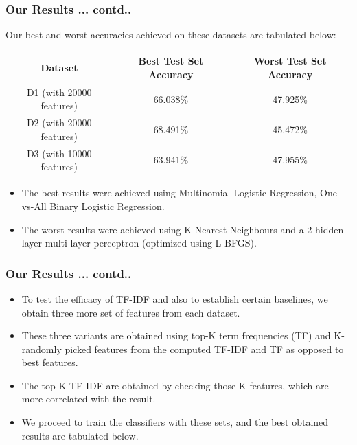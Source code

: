 \documentclass[9pt, compress]{beamer}
\begin{document}
\begin{frame}[fragile]
	\frametitle{Our Results ... contd..}
Our best and worst accuracies achieved on these datasets are tabulated below:
\begin{center}
\begin{tabular}{|c|c|c|}
\hline
Dataset & Best Test Set Accuracy & Worst Test Set Accuracy \\
\hline
\hline
D1 (with 20000 features) & 66.038\% & 47.925\% \\
\hline
D2 (with 20000 features) & 68.491\% & 45.472\% \\
\hline
D3 (with 10000 features) & 63.941\% & 47.955\% \\
\hline
\end{tabular}
\end{center}
\begin{itemize}
\item The best results were achieved using Multinomial Logistic Regression, One-vs-All Binary Logistic Regression.
\item The worst results were achieved using K-Nearest Neighbours and a 2-hidden layer multi-layer perceptron (optimized using L-BFGS).
\end{itemize}
\end{frame}

\begin{frame}[fragile]
	\frametitle{Our Results ... contd..}
\vspace{-10mm}
\begin{itemize}
\item To test the efficacy of TF-IDF and also to establish certain baselines, we obtain three more set of features from each dataset.
\item These three variants are obtained using top-K term frequencies (TF) and K-randomly picked features from the computed TF-IDF and TF as opposed to best features.
\item The top-K TF-IDF are obtained by checking those K features, which are more correlated with the result.
\item We proceed to train the classifiers with these sets, and the best obtained results are tabulated below.
\end{itemize}
\begin{center}

\end{center}
\end{frame}
\end{document}
